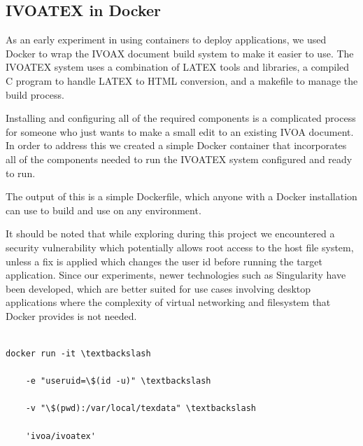 \documentclass[final]{beamer}
\begin{document}
\begin{frame}[t]
\begin{multicols}{3}
\subsection{IVOATEX in Docker}

As an early experiment in using containers to deploy applications, we used Docker to wrap the IVOAX\cite{ivoatex} document build system to make it easier to use. The IVOATEX system uses a combination of LATEX tools and libraries, a compiled C program to handle LATEX to HTML conversion, and a makefile to manage the build process.

Installing and configuring all of the required components is a complicated process for someone who just wants to make a small edit to an existing IVOA document. In order to address this we created a simple Docker container that incorporates all of the components needed to run the IVOATEX system configured and ready to run.

The output of this is a simple Dockerfile, which anyone with a Docker installation can use to build and use on any environment.

\hfill 

It should be noted that while exploring during this project we encountered a security vulnerability which potentially allows root access to the host file system, unless a fix is applied which changes the user id before running the target application. Since our experiments, newer technologies such as Singularity have been developed, which are better suited for use cases involving desktop applications where the complexity of virtual networking and filesystem that Docker provides is not needed. 


\hfill \break

%
%
%

\begin{verbatim}

docker run -it \textbackslash

    -e "useruid=\$(id -u)" \textbackslash
    
    -v "\$(pwd):/var/local/texdata" \textbackslash
    
    'ivoa/ivoatex'


\end{verbatim}
\end{multicols}
\end{frame}
\end{document}
